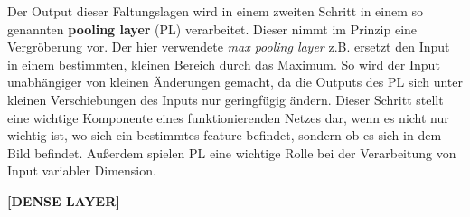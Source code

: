 Der Output dieser Faltungslagen wird in einem zweiten Schritt in einem so
genannten \textbf{pooling layer} (PL) verarbeitet. Dieser nimmt im Prinzip eine
Vergröberung vor. Der hier verwendete \textit{max pooling layer} z.B. ersetzt
den Input in einem bestimmten, kleinen Bereich durch das Maximum. So wird der
Input unabhängiger von kleinen Änderungen gemacht, da die Outputs des PL sich
unter kleinen Verschiebungen des Inputs nur geringfügig ändern. Dieser Schritt
stellt eine wichtige Komponente eines funktionierenden Netzes dar, wenn es
nicht nur wichtig ist, wo sich ein bestimmtes feature befindet, sondern
ob es sich in dem Bild befindet.
Außerdem spielen PL eine wichtige Rolle bei der Verarbeitung von Input
variabler Dimension.

\textbf{[DENSE LAYER]}
